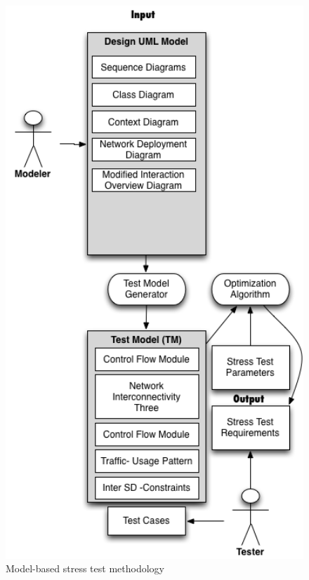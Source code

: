 \documentclass{report}
\begin{document}
\begin{figure}[!ht]
\begin{minipage}{.5\textwidth}
\centering
\includegraphics[width=1\textwidth]{./images/modelmethodology.png}
\caption{Model-based stress test methodology}
\label{fig:modelbased}
\end{minipage}
\begin{minipage}{.5\textwidth}
\centering

\end{minipage}
\end{figure}
\end{document}
